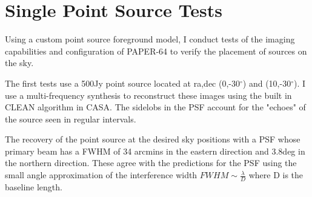 \documentclass[hidelinks]{article}
\newcommand{\degree}{$^{\circ}$}
\begin{document}
\section{Single Point Source Tests}{
Using a custom point source foreground model, I conduct tests of the imaging capabilities and configuration of PAPER-64 to verify the placement of sources on the sky.

The first tests use a 500Jy point source located at ra,dec (0,-30\degree) and (10,-30\degree). I use a multi-frequency synthesis to reconstruct these images using the built in CLEAN algorithm in CASA. The sidelobs in the PSF account for the "echoes" of the source seen in regular intervals.

The recovery of the point source at the desired sky positions with a PSF whose primary beam has a FWHM of 34 arcmins in the eastern direction and 3.8deg in the northern direction. These agree with the predictions for the PSF using the small angle approximation of the interference width $FWHM\sim \frac{\lambda}{D}$ where D is the baseline length.

}
\end{document}
